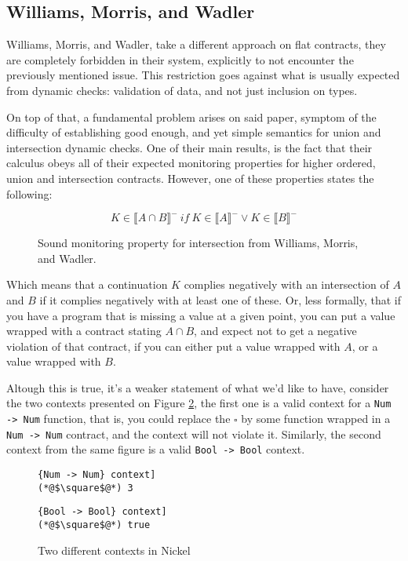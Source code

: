 \documentclass[sigplan,10pt,review,anonymous]{acmart}
\newcommand{\unsure}[2][1=]{}
\newcommand{\nickel}[1]{\lstinline[language=nickel]{#1}}
\begin{document}
\subsection*{Williams, Morris, and Wadler}
\label{sec:will-morr-wadl}
\unsure{Subsection title?}

Williams, Morris, and Wadler, take a different approach on flat contracts,
they are completely forbidden in their system, explicitly to not encounter
the previously mentioned issue.
This restriction goes against what is usually expected from dynamic checks:
validation of data, and not just inclusion on types.

On top of that, a fundamental problem arises on said paper,
symptom of the difficulty of establishing good enough, and yet
simple semantics for union and intersection dynamic checks.
One of their main results, is the fact that their calculus obeys
all of their expected monitoring properties for higher ordered, union
and intersection contracts.
However, one of these properties states the following:

\begin{figure}[h]
$$ K \in \llbracket A \cap B \rrbracket^-~if~K \in \llbracket A \rrbracket^- \lor K \in \llbracket B \rrbracket^- $$
\caption{Sound monitoring property for intersection from Williams, Morris, and Wadler.}
\label{fig:wmw-semantics}
\end{figure}

Which means that a continuation $K$ complies negatively with an
intersection of $A$ and $B$ if it complies negatively with at least one of these.
Or, less formally, that if you have a program that is missing a value at a given point,
you can put a value wrapped with a contract stating $A \cap B$,
and expect not to get a negative violation of that contract,
if you can either put a value
wrapped with $A$, or a value wrapped with $B$.

Altough this is true, it's a weaker statement of what we'd like to have,
consider the two contexts presented on Figure \ref{fig:valid-contexts},
the first one is a valid context for a \nickel{Num -> Num} function,
that is, you could replace the $\square$ by some function wrapped in a
\nickel{Num -> Num} contract, and the context will not violate it.
Similarly, the second context from the same figure is a valid
\nickel{Bool -> Bool} context.

\begin{figure}[h]
\begin{lstlisting}[language=nickel, title=\nickel{Num -> Num} context]
(*@$\square$@*) 3
\end{lstlisting}
\begin{lstlisting}[language=nickel, title=\nickel{Bool -> Bool} context]
(*@$\square$@*) true
\end{lstlisting}
\caption{Two different contexts in Nickel}
\label{fig:valid-contexts}
\end{figure}
\end{document}

